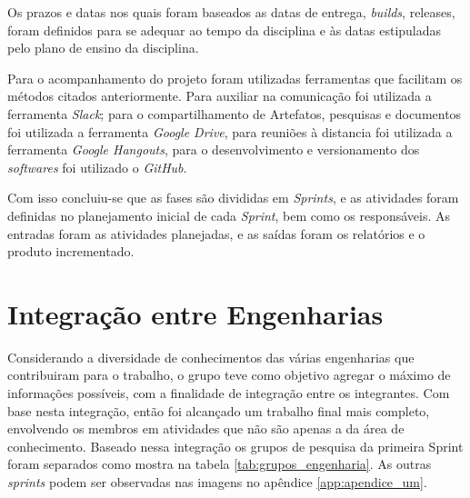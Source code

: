 Os prazos e datas nos quais foram baseados as datas de entrega, \textit{builds}, releases, foram definidos para se adequar ao tempo da disciplina e às datas estipuladas pelo plano de ensino da disciplina.

Para o acompanhamento do projeto foram utilizadas ferramentas que facilitam os métodos citados anteriormente. Para auxiliar na comunicação foi utilizada a ferramenta \textit{Slack}; para o compartilhamento de Artefatos, pesquisas e documentos foi utilizada a ferramenta \textit{Google Drive}, para reuniões à distancia foi utilizada a ferramenta \textit{Google Hangouts}, para o desenvolvimento e versionamento dos \textit{softwares} foi utilizado o \textit{GitHub}.

Com isso concluiu-se que as fases são divididas em \textit{Sprints}, e as atividades foram definidas no planejamento inicial de cada \textit{Sprint}, bem como os responsáveis. As entradas foram as atividades planejadas, e as saídas foram os relatórios e o produto incrementado.

\section{Integração entre Engenharias}

Considerando a diversidade de conhecimentos das várias engenharias que contribuiram para o trabalho, o grupo teve como objetivo agregar o máximo de informações possíveis, com a finalidade de integração entre os integrantes. Com base nesta integração, então foi alcançado um trabalho final mais completo, envolvendo os membros em atividades que não são apenas a da área de conhecimento. Baseado nessa integração os grupos de pesquisa da primeira Sprint foram separados como mostra na tabela \ref{tab:grupos_engenharia}. As outras \textit{sprints} podem ser observadas nas imagens no apêndice \ref{app:apendice_um}.

\begin{table}[!h]
\centering
{}
\caption{Exemplo de integração entre engenharias e temas}
\label{tab:grupos_engenharia}
\end{table}

